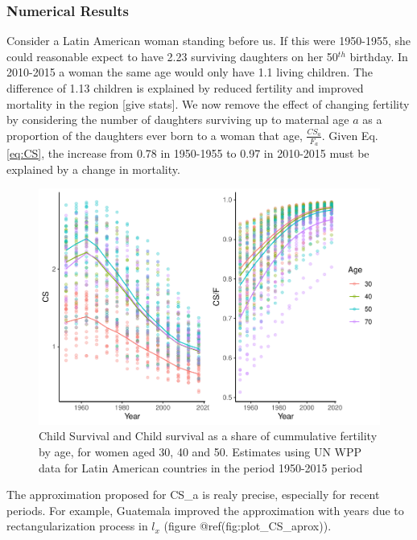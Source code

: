 \documentclass[
]{article}
\begin{document}
\hypertarget{numerical-results}{%
\subsubsection{Numerical Results}\label{numerical-results}}

Consider a Latin American woman standing before us. If this were
1950-1955, she could reasonable expect to have 2.23 surviving daughters
on her 50\(^{th}\) birthday. In 2010-2015 a woman the same age would
only have 1.1 living children. The difference of 1.13 children is
explained by reduced fertility and improved mortality in the region
{[}give stats{]}. We now remove the effect of changing fertility by
considering the number of daughters surviving up to maternal age \(a\)
as a proportion of the daughters ever born to a woman that age,
\(\frac{CS_a}{F_a}\). Given Eq. \ref{eq:CS}, the increase from 0.78 in
1950-1955 to 0.97 in 2010-2015 must be explained by a change in
mortality.

\begin{figure}
\centering
\includegraphics{paper_files/figure-latex/plot_CS-1.pdf}
\caption{Child Survival and Child survival as a share of cummulative
fertility by age, for women aged 30, 40 and 50. Estimates using UN WPP
data for Latin American countries in the period 1950-2015 period}
\end{figure}

The approximation proposed for CS\_a is realy precise, especially for
recent periods. For example, Guatemala improved the approximation with
years due to rectangularization process in \(l_x\) (figure
@ref(fig:plot\_CS\_aprox)).
\end{document}
